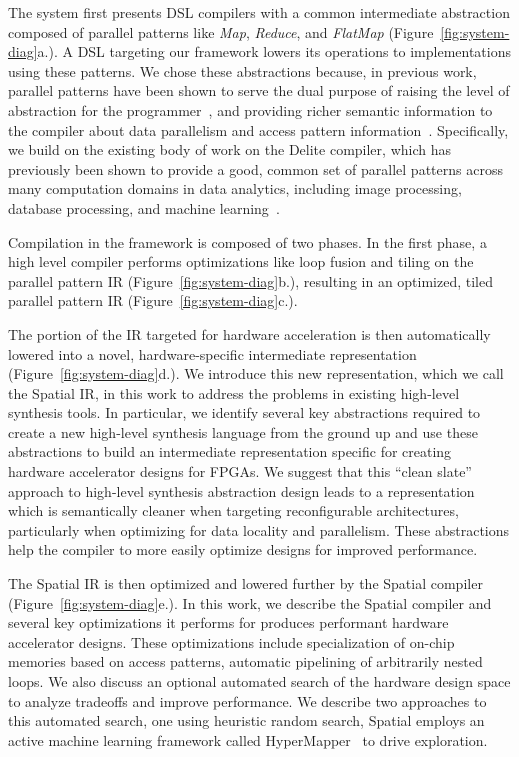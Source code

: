 The system first presents DSL compilers with a common intermediate abstraction composed of
parallel patterns like \emph{Map}, \emph{Reduce}, and \emph{FlatMap} (Figure~\ref{fig:system-diag}a.).
A DSL targeting our framework lowers its operations to implementations using these patterns.
We chose these abstractions because, in previous work, parallel patterns have
been shown to serve the dual purpose of raising the
level of abstraction for the
programmer~\cite{ecoop13sujeeth,pldi13halide}, and providing richer
semantic information to the compiler about data parallelism
and access pattern information~\cite{delite-tecs14}.
Specifically, we build on the existing body of work
on the Delite compiler, which has previously been shown
to provide a good, common set of parallel patterns across many computation domains in data analytics, including
image processing, database processing, and machine learning~\cite{pldi13halide,ecoop13sujeeth}.

Compilation in the framework is composed of two phases. In the first phase,
a high level compiler performs optimizations like loop fusion and tiling
on the parallel pattern IR (Figure~\ref{fig:system-diag}b.), resulting in an
optimized, tiled parallel pattern IR (Figure~\ref{fig:system-diag}c.).

The portion of the IR targeted for hardware acceleration is then automatically
lowered into a novel, hardware-specific intermediate
representation (Figure~\ref{fig:system-diag}d.).
We introduce this new representation, which we call the Spatial IR,
in this work to address the problems in existing
high-level synthesis tools. In particular, we identify several key
abstractions required to create a new high-level synthesis language from the
ground up and use these abstractions to build an intermediate representation
specific for creating hardware accelerator designs for FPGAs.
We suggest that this ``clean slate'' approach to high-level synthesis abstraction
design leads to a representation which is semantically cleaner when targeting
reconfigurable architectures, particularly when optimizing for data locality and parallelism.
These abstractions help the compiler to more easily optimize designs for improved performance.

The Spatial IR is then optimized and lowered further by the Spatial compiler (Figure~\ref{fig:system-diag}e.).
In this work, we describe the Spatial compiler and several key optimizations it
performs for produces performant hardware accelerator designs.
These optimizations include specialization of on-chip memories based on access patterns,
automatic pipelining of arbitrarily nested loops.
We also discuss an optional automated search of the hardware design space
to analyze tradeoffs and improve performance.
We describe two approaches to this automated search, one using heuristic random
search, Spatial employs an active machine learning framework called
HyperMapper~\cite{Bodin2016:PACT16} to drive exploration.

